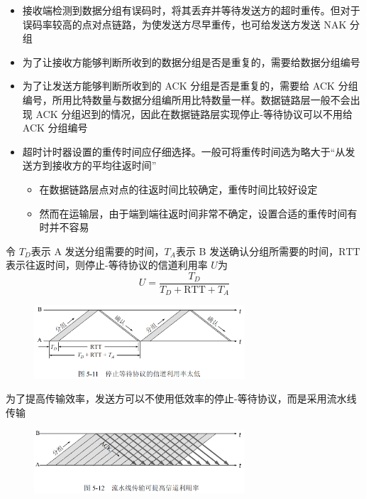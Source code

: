 \documentclass[cs4size,a4paper,10pt]{ctexart}
\begin{document}
	\begin{itemize}
		\item 接收端检测到数据分组有误码时，将其丢弃并等待发送方的超时重传。但对于误码率较高的点对点链路，为使发送方尽早重传，也可给发送方发送 NAK 分组
		\item 为了让接收方能够判断所收到的数据分组是否是重复的，需要给数据分组编号
		\item 为了让发送方能够判断所收到的 ACK 分组是否是重复的，需要给 ACK 分组编号，所用比特数量与数据分组编所用比特数量一样。数据链路层一般不会出现 ACK 分组迟到的情况，因此在数据链路层实现停止-等待协议可以不用给 ACK 分组编号
		\item 超时计时器设置的重传时间应仔细选择。一般可将重传时间选为略大于“从发送方到接收方的平均往返时间”
		\begin{itemize}
			\item 在数据链路层点对点的往返时间比较确定，重传时间比较好设定
			\item 然而在运输层，由于端到端往返时间非常不确定，设置合适的重传时间有时并不容易
		\end{itemize}
	\end{itemize}

	令 $T_D$​​​​ 表示 A 发送分组需要的时间，$T_A$​​​ ​表示 B 发送确认分组所需要的时间，$\mathrm{RTT}$​​ ​​​​表示往返时间，则停止-等待协议的信道利用率 $U$​​​​ 为
	$$U=\frac{T_D}{T_D+\mathrm{RTT}+T_A}$$

	\begin{figure}[H]
		\centering
		\includegraphics[width=0.7\textwidth]{img/3.2.2.2}
	\end{figure}

	为了提高传输效率，发送方可以不使用低效率的停止-等待协议，而是采用流水线传输
	\begin{figure}[H]
		\centering
		\includegraphics[width=0.7\textwidth]{img/3.2.2.3}
	\end{figure}
\end{document}
